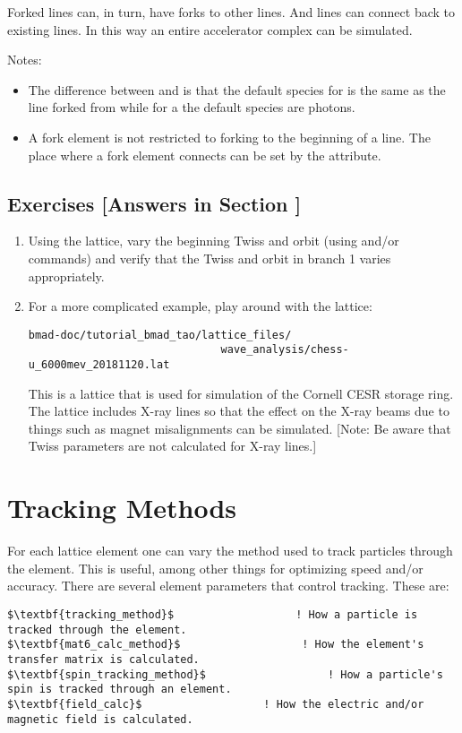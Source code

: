 \documentclass{hitec}     %
\newcommand{\Section}[1]{\section{#1}\vspace*{-1ex}}
\begin{document}
{Forked lines can, in turn, have forks to other lines. And lines can connect back to existing lines. In this
way an entire accelerator complex can be simulated. 

Notes:
\vspace{-5 pt}
\begin{itemize}
\item
The difference between  and  is that the default species for  is
the same as the line forked from while for a  the default species are photons.
\item
A fork element is not restricted to forking to the beginning of a line.  The place where a fork
element connects can be set by the  attribute.
\end{itemize}


\subsection{Exercises [Answers in Section ]}
\label{s:fork.ex}

\begin{enumerate}[label=\thesection.\arabic{enumi}]
\item
Using the  lattice, vary the beginning Twiss and orbit (using  and/or
 commands) and verify that the Twiss and orbit in branch 1 varies appropriately.
%
\item
For a more complicated example, play around with the lattice:
\begin{lstlisting}[mathescape]
bmad-doc/tutorial_bmad_tao/lattice_files/
                              wave_analysis/chess-u_6000mev_20181120.lat
\end{lstlisting}
This is a lattice that is used for simulation of the Cornell CESR storage ring. The lattice includes
X-ray lines so that the effect on the X-ray beams due to things such as magnet misalignments can
be simulated. [Note: Be aware that Twiss parameters are not calculated for X-ray lines.]
\end{enumerate}

\newpage

\Section{Tracking Methods}
\label{s:methods}

For each lattice element one can vary the method used to track particles through the element. This is
useful, among other things for optimizing speed and/or accuracy. There are several element parameters
that control tracking. These are:
\begin{lstlisting}[mathescape]
$\textbf{tracking_method}$                   ! How a particle is tracked through the element.
$\textbf{mat6_calc_method}$                   ! How the element's transfer matrix is calculated.
$\textbf{spin_tracking_method}$                   ! How a particle's spin is tracked through an element.
$\textbf{field_calc}$                   ! How the electric and/or magnetic field is calculated.
\end{lstlisting}

}
\end{document}
